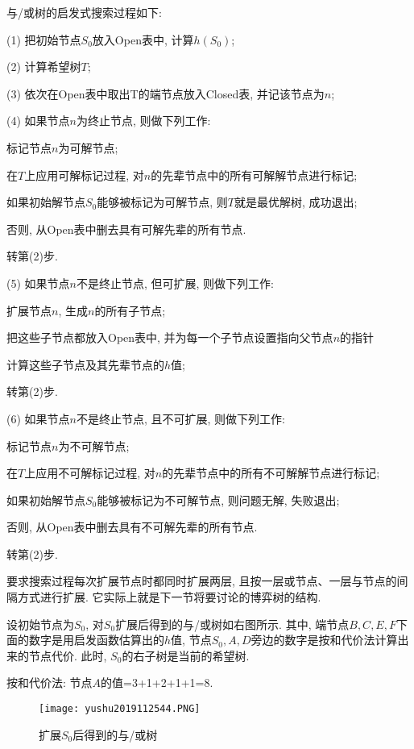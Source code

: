 与/或树的启发式搜索过程如下:

(1) 把初始节点$S_0$放入Open表中, 计算$h(S_0)$;

(2) 计算希望树$T$;

(3) 依次在Open表中取出T的端节点放入Closed表, 并记该节点为$n$;

(4) 如果节点$n$为终止节点, 则做下列工作:

  \qquad  {}标记节点$n$为可解节点;

  \qquad    {} 在$T$上应用可解标记过程, 对$n$的先辈节点中的所有可解解节点进行标记;

  \qquad    {} 如果初始解节点$S_0$能够被标记为可解节点, 则$T$就是最优解树, 成功退出;

  \qquad    {} 否则, 从Open表中删去具有可解先辈的所有节点.

  \qquad    {} 转第(2)步.

(5) 如果节点$n$不是终止节点, 但可扩展, 则做下列工作:

  \qquad    {} 扩展节点$n$, 生成$n$的所有子节点;

  \qquad    {} 把这些子节点都放入Open表中, 并为每一个子节点设置指向父节点$n$的指针

  \qquad    {} 计算这些子节点及其先辈节点的$h$值;

  \qquad    {} 转第(2)步.

(6) 如果节点$n$不是终止节点, 且不可扩展, 则做下列工作:

   \qquad   {} 标记节点$n$为不可解节点;

   \qquad   {} 在$T$上应用不可解标记过程, 对$n$的先辈节点中的所有不可解解节点进行标记;

   \qquad   {} 如果初始解节点$S_0$能够被标记为不可解节点, 则问题无解, 失败退出;

   \qquad   {} 否则, 从Open表中删去具有不可解先辈的所有节点.

   \qquad   {} 转第(2)步.
\begin{remark}
    要求搜索过程每次扩展节点时都同时扩展两层, 且按一层或节点、一层与节点的间隔方式进行扩展. 它实际上就是下一节将要讨论的博弈树的结构.
\end{remark}

设初始节点为$S_0$, 对$S_0$扩展后得到的与/或树如右图所示. 其中, 端节点$B,C,E,F$下面的数字是用启发函数估算出的$h$值, 节点$S_0,A,D$旁边的数字是按和代价法计算出来的节点代价.
此时, $S_0$的右子树是当前的希望树.
\begin{example}
    按和代价法: 节点$A$的值=3+1+2+1+1=8.
\begin{figure}[H]
  \centering
  \texttt{[image: yushu2019112544.PNG]}
  \caption{扩展$S_0$后得到的与/或树}
  \label{AI32fig44}
\end{figure}
\end{example}

